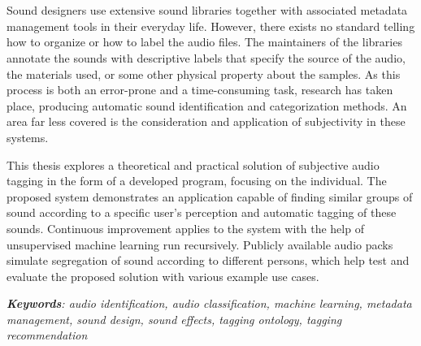 \bgroup{}

\chapter*{}
Sound designers use extensive sound libraries together with associated metadata management tools in their everyday life. However, there exists no standard telling how to organize or how to label the audio files. The maintainers of the libraries annotate the sounds with descriptive labels that specify the source of the audio, the materials used, or some other physical property about the samples. As this process is both an error-prone and a time-consuming task, research has taken place, producing automatic sound identification and categorization methods. An area far less covered is the consideration and application of subjectivity in these systems.

This thesis explores a theoretical and practical solution of subjective audio tagging in the form of a developed program, focusing on the individual. The proposed system demonstrates an application capable of finding similar groups of sound according to a specific user's perception and automatic tagging of these sounds. Continuous improvement applies to the system with the help of unsupervised machine learning run recursively. Publicly available audio packs simulate segregation of sound according to different persons, which help test and evaluate the proposed solution with various example use cases.

\bigskip
\bigskip

\noindent\textit{\textbf{Keywords}: audio identification, audio classification, machine learning, metadata management, sound design, sound effects, tagging ontology, tagging recommendation}

\egroup{}